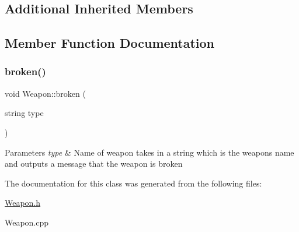 \subsection*{Additional Inherited Members}


\subsection{Member Function Documentation}
\mbox{\label{classWeapon_ab549867377210181dfa544a042a5862a}} 
\subsubsection{\texorpdfstring{broken()}{broken()}}
{\footnotesize\ttfamily void Weapon\+::broken (\begin{DoxyParamCaption}\item[{string}]{type }\end{DoxyParamCaption})}


\begin{DoxyParams}{Parameters}
{\em type} & Name of weapon takes in a string which is the weapons name and outputs a message that the weapon is broken \\
\hline
\end{DoxyParams}


The documentation for this class was generated from the following files\+:\begin{DoxyCompactItemize}
\item 
\hyperlink{Weapon_8h}{Weapon.\+h}\item 
Weapon.\+cpp\end{DoxyCompactItemize}
